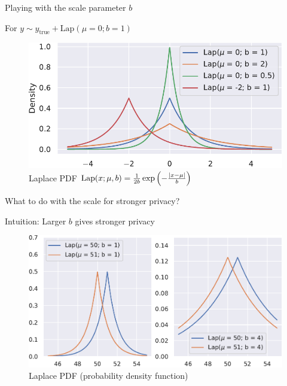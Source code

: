 \documentclass[12pt,aspectratio=169,handout]{beamer}
\begin{document}
\begin{frame}{Playing with the scale parameter $b$}

For $y \sim y_{\mathrm{true}} + \textrm{Lap}(\mu = 0; b=1)$


\begin{figure}
\includegraphics[width=0.6\linewidth]{img/laplace-distributions.pdf}
\caption{Laplace PDF $\textrm{Lap}(x; \mu, b) = \frac{1}{2b} \exp \left( - \frac{\abs{x - \mu}}{b}  \right)$
}
\end{figure}

What to do with the scale for stronger privacy?
	
\end{frame}


\begin{frame}{Intuition: Larger $b$ gives stronger privacy}

\begin{figure}
\includegraphics[width=0.9\linewidth]{img/laplace-grid1.pdf}
\caption{Laplace PDF (probability density function)}
\end{figure}
	
\end{frame}
\end{document}
